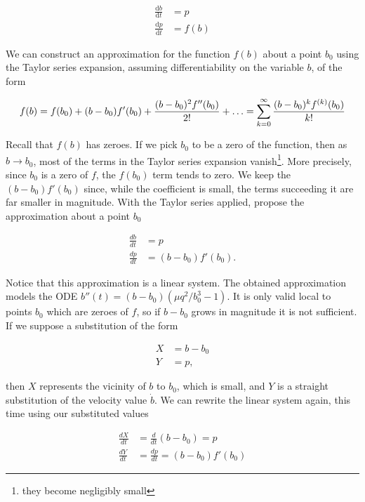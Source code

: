 \documentclass{article}
\begin{document}
\begin{align}
    \frac{\mathrm{d}b}{\mathrm{d}t}       & = p \\
    \frac{\mathrm{d}p}{\mathrm{d}t} & = f(b)
    \label{eqn:first_order_modified}
\end{align}

We can construct an approximation for the function $f(b)$ about a point $b_0$ using the Taylor series expansion, assuming differentiability on the variable $b$, of the form

\begin{equation}
    f(b) = f(b_0) + (b-b_0)f'(b_0) + \frac{(b-b_0)^2 f''(b_0)}{2!} + \mathellipsis = \sum_{k=0}^\infty\frac{(b-b_0)^{k}f^{(k)}(b_0)}{k!}
    \label{eqn:taylor_series}
\end{equation}

Recall that $f(b)$ has zeroes. If we pick $b_0$ to be a zero of the function, then as $b\rightarrow b_0$,
most of the terms in the Taylor series expansion vanish\footnote{they become negligibly small}.
More precisely, since $b_0$ is a zero of $f$, the $f(b_0)$ term tends to zero.
We keep the $(b-b_0)f'(b_0)$ since, while the coefficient is small,
the terms succeeding it are far smaller in magnitude.
With the Taylor series applied, propose the approximation about a point $b_0$

\begin{align}
    \frac{db}{dt}       & = p         \\
    \frac{dp}{dt} & = (b-b_0)f'(b_0).
    \label{eqn:first_order_approximated}
\end{align}

Notice that this approximation is a linear system. The obtained approximation models the ODE $b''(t) = (b-b_0)(\mu q^2/b_0^3-1)$.
It is only valid local to points $b_0$ which are zeroes of $f$, so if $b-b_0$ grows in magnitude it is not sufficient.
If we suppose a substitution of the form

\begin{align}
    X & = b - b_0  \\
    Y & = p,
\end{align}

then $X$ represents the vicinity of $b$ to $b_0$, which is small,
and $Y$ is a straight substitution of the velocity value $\dot{b}$.
We can rewrite the linear system again, this time using our substituted values

\begin{align}
    \frac{dX}{dt} & = \frac{d}{dt}\left(b-b_0\right) = p \\
    \frac{dY}{dt} & = \frac{dp}{dt} = (b-b_0)f'(b_0)
\end{align}
\end{document}
